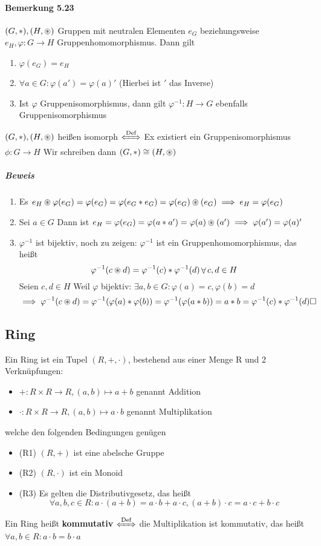\documentclass[a4paper]{scrartcl}
\DeclareMathOperator{\Forall}{\forall}
\theoremstyle{definition}
\theoremstyle{plain}
\theoremstyle{plain}
\theoremstyle{remark}
\theoremstyle{remark}
\theoremstyle{remark}
\theoremstyle{remark}
\theoremstyle{remark}
\begin{document}
\paragraph{Bemerkung 5.23}
\label{sec-3-1-8-2}
$(G,*),(H,\oast)$ Gruppen mit neutralen Elementen $e_G$ beziehungsweise $e_H,\varphi:G\to H$ Gruppenhomomorphismus. Dann gilt
\begin{enumerate}
\item $\varphi(e_G) = e_H$
\item $\Forall a\in G:\varphi(a') = \varphi(a)'$ (Hierbei ist $'$ das Inverse)
\item Ist $\varphi$ Gruppenisomorphismus, dann gilt $\varphi^{-1}:H\to G$ ebenfalls Gruppenisomorphismus
\end{enumerate}
$(G,*),(H,\oast)$ heißen isomorph $\xLeftrightarrow{\text{Def}}$ Ex existiert ein Gruppenisomorphismus $\phi:G\to H$ Wir schreiben dann $(G,*) \cong (H,\oast)$
\subparagraph{Beweis}
\label{sec-3-1-8-2-1}
\begin{enumerate}
\item Es $e_H\oast \varphi(e_G) = \varphi(e_G) = \varphi(e_G*e_G) = \varphi(e_G) \oast(e_G) \implies e_H = \varphi(e_G)$
\item Sei $a\in G$ Dann ist $e_H = \varphi(e_G) = \varphi(a*a') = \varphi(a)\oast(a') \implies \varphi(a') = \varphi(a)'$
\item $\varphi^{-1}$ ist bijektiv, noch zu zeigen: $\varphi^{-1}$ ist ein Gruppenhomomorphismus, das heißt
\[\varphi^{-1}(c\oast d) = \varphi^{-1}(c)*\varphi^{-1}(d) \Forall c,d\in H\]
Seien $c,d\in H$ Weil $\varphi$ bijektiv: $\exists a,b\in G:\varphi(a) = c,\varphi(b) =d$
\[\implies \varphi^{-1}(c\oast d) = \varphi^{-1}(\varphi(a)*\varphi(b)) = \varphi^{-1}(\varphi(a*b)) = a*b = \varphi^{-1}(c)*\varphi^{-1}(d)\hfill\square\]
\end{enumerate}
\subsection{Ring}
\label{sec-3-2}
Ein Ring ist ein Tupel $(R,+,\cdot)$, bestehend aus einer Menge R und 2 Verknüpfungen:
\begin{itemize}
\item $+:R\times R \to R,(a,b)\mapsto a + b$ \hfill genannt Addition
\item $\cdot:R\times R\to R, (a,b)\mapsto a\cdot b$ \hfill genannt Multiplikation
\end{itemize}
welche den folgenden Bedingungen genügen
\begin{itemize}
\item (R1) $(R,+)$ ist eine abelsche Gruppe
\item (R2) $(R,\cdot)$ ist ein Monoid
\item (R3) Es gelten die Distributivgesetz, das heißt
\[\Forall a,b,c\in R: a\cdot(a + b) = a\cdot b + a\cdot c, (a+b)\cdot c = a\cdot c + b\cdot c\]
\end{itemize}
Ein Ring heißt \textbf{kommutativ} $\xLeftrightarrow{\text{Def}}$ die Multiplikation ist kommutativ, das heißt $\Forall a,b\in R: a\cdot b = b\cdot a$
\end{document}
